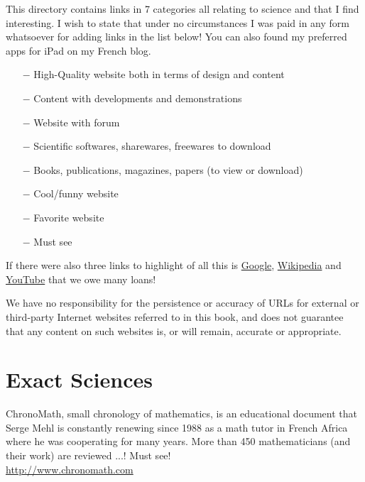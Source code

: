 	This directory contains links in 7 categories all relating to science and that I find interesting. I wish to state that under no circumstances I was paid in any form whatsoever for adding links in the list below! You can also found my preferred apps for iPad on my French blog. 
	
	\begin{itemize}	 
		\item[$-$] {\Large {}} High-Quality website both in terms of design and content
		\item[$-$] {\Large {}} Content with developments and demonstrations
		\item[$-$] {\Large {}} Website with forum
		\item[$-$] {\Large {}} Scientific softwares, sharewares, freewares to download
		\item[$-$] {\Large {}} Books, publications, magazines, papers (to view or download)
		\item[$-$] {\Large {}} Cool/funny website
		\item[$-$] {\Large {}} Favorite website
		\item[$-$] {\Large {}} Must see 
	\end{itemize}
	
	If there were also three links to highlight of all this is \href{http://www.google.com}{\color{blue} Google}, \href{http://www.wikipedia.com}{\color{blue} Wikipedia} and \href{http://www.youtube.com}{\color{blue} YouTube} that we owe many loans!	
		
	\begin{tcolorbox}[title=Remark,colframe=black,arc=10pt]
	We have no responsibility for the persistence or accuracy of URLs for external or third-party Internet websites referred to in this book, and does not guarantee that any content on such websites is, or will remain, accurate or appropriate. 
	\end{tcolorbox}
	
	\pagebreak

	\section{Exact Sciences}

	{\Large {}}{\Large {}}{\Large {}}{\Large {}}{\Large {}}{\Large {}}\bcdfrance{} ChronoMath, small chronology of mathematics, is an educational document that Serge Mehl is constantly renewing since 1988 as a math tutor in French Africa where he was cooperating for many years. More than 450 mathematicians (and their work) are reviewed ...! Must see!\\
	\href{http://www.chronomath.com}{\color{blue} http://www.chronomath.com}
	
